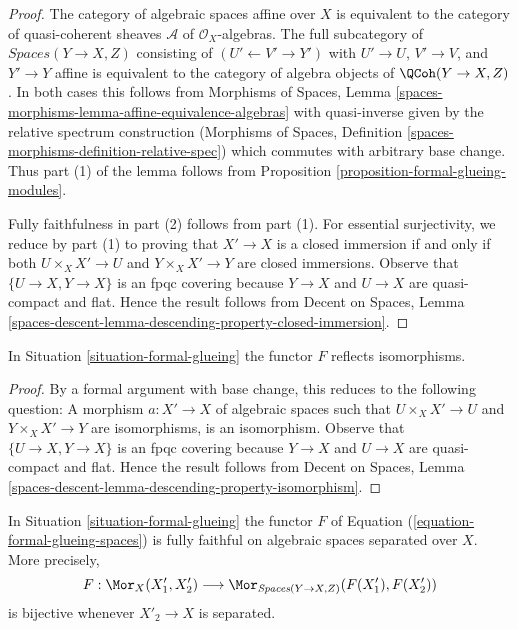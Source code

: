 \begin{proof}
The category of algebraic spaces affine over $X$ is equivalent to the
category of quasi-coherent sheaves $\mathcal{A}$ of $\mathcal{O}_X$-algebras.
The full subcategory of $\textit{Spaces}(Y \to X, Z)$ consisting of
$(U' \leftarrow V' \rightarrow Y')$ with $U' \to U$, $V' \to V$,
and $Y' \to Y$ affine is equivalent to the category of
algebra objects of $\QCoh(Y \to X, Z)$. In both cases this follows
from Morphisms of Spaces, Lemma
\ref{spaces-morphisms-lemma-affine-equivalence-algebras}
with quasi-inverse given by the relative spectrum construction
(Morphisms of Spaces, Definition
\ref{spaces-morphisms-definition-relative-spec})
which commutes with arbitrary base change. Thus part (1) of the
lemma follows from Proposition \ref{proposition-formal-glueing-modules}.

\medskip\noindent
Fully faithfulness in part (2) follows from part (1). For essential
surjectivity, we reduce by part (1) to proving that $X' \to X$
is a closed immersion if and only if both $U \times_X X' \to U$ and
$Y \times_X X' \to Y$ are closed immersions. Observe that
$\{U \to X, Y \to X\}$ is an fpqc covering
because $Y \to X$ and $U \to X$ are quasi-compact and flat.
Hence the result follows from
Decent on Spaces, Lemma
\ref{spaces-descent-lemma-descending-property-closed-immersion}.
\end{proof}

\begin{lemma}
\label{lemma-reflects-isomorphisms}
In Situation \ref{situation-formal-glueing} the functor $F$
reflects isomorphisms.
\end{lemma}

\begin{proof}
By a formal argument with base change, this reduces to the following
question: A morphism $a : X' \to X$ of algebraic spaces such that
$U \times_X X' \to U$ and $Y \times_X X' \to Y$ are isomorphisms, is
an isomorphism. Observe that $\{U \to X, Y \to X\}$ is an fpqc covering
because $Y \to X$ and $U \to X$ are quasi-compact and flat.
Hence the result follows from
Decent on Spaces, Lemma
\ref{spaces-descent-lemma-descending-property-isomorphism}.
\end{proof}

\begin{lemma}
\label{lemma-fully-faithful-on-separated}
In Situation \ref{situation-formal-glueing} the functor $F$ of
Equation (\ref{equation-formal-glueing-spaces}) is fully faithful
on algebraic spaces separated over $X$. More precisely,
$$
F :
\Mor_X(X'_1, X'_2)
\longrightarrow
\Mor_{\textit{Spaces}(Y \to X, Z)}(F(X'_1), F(X'_2))
$$
is bijective whenever $X'_2 \to X$ is separated.
\end{lemma}

